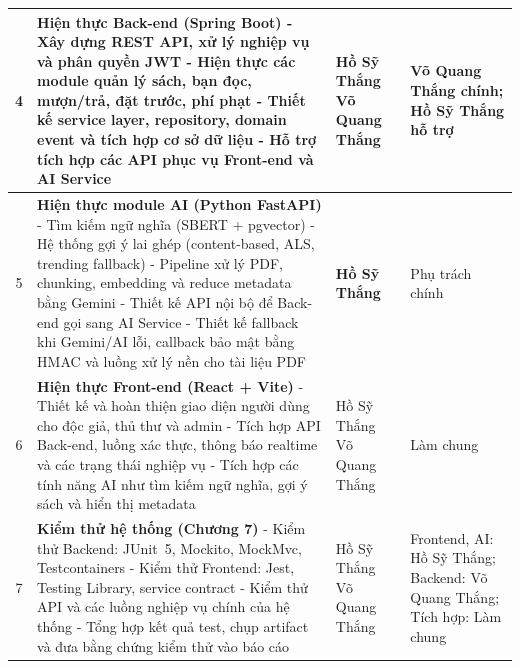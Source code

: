 \begin{center}
\begin{longtable}{|c|p{8.1cm}|p{2.8cm}|p{2.4cm}|}
4 & \textbf{Hiện thực Back-end (Spring Boot)} \newline
- Xây dựng REST API, xử lý nghiệp vụ và phân quyền JWT \newline
- Hiện thực các module quản lý sách, bạn đọc, mượn/trả, đặt trước, phí phạt \newline
- Thiết kế service layer, repository, domain event và tích hợp cơ sở dữ liệu \newline
- Hỗ trợ tích hợp các API phục vụ Front-end và AI Service
& Hồ Sỹ Thắng \newline Võ Quang Thắng & Võ Quang Thắng chính; Hồ Sỹ Thắng hỗ trợ \\
\hline

5 & \textbf{Hiện thực module AI (Python FastAPI)} \newline
- Tìm kiếm ngữ nghĩa (SBERT + pgvector) \newline
- Hệ thống gợi ý lai ghép (content-based, ALS, trending fallback) \newline
- Pipeline xử lý PDF, chunking, embedding và reduce metadata bằng Gemini \newline
- Thiết kế API nội bộ để Back-end gọi sang AI Service \newline
- Thiết kế fallback khi Gemini/AI lỗi, callback bảo mật bằng HMAC và luồng xử lý nền cho tài liệu PDF
& \textbf{Hồ Sỹ Thắng} & Phụ trách chính \\
\hline

6 & \textbf{Hiện thực Front-end (React + Vite)} \newline
- Thiết kế và hoàn thiện giao diện người dùng cho độc giả, thủ thư và admin \newline
- Tích hợp API Back-end, luồng xác thực, thông báo realtime và các trạng thái nghiệp vụ \newline
- Tích hợp các tính năng AI như tìm kiếm ngữ nghĩa, gợi ý sách và hiển thị metadata
& Hồ Sỹ Thắng \newline Võ Quang Thắng & Làm chung \\
\hline

7 & \textbf{Kiểm thử hệ thống (Chương 7)} \newline
- Kiểm thử Backend: JUnit~5, Mockito, MockMvc, Testcontainers \newline
- Kiểm thử Frontend: Jest, Testing Library, service contract \newline
- Kiểm thử API và các luồng nghiệp vụ chính của hệ thống \newline
- Tổng hợp kết quả test, chụp artifact và đưa bằng chứng kiểm thử vào báo cáo
& Hồ Sỹ Thắng \newline Võ Quang Thắng & Frontend, AI: Hồ Sỹ Thắng; Backend: Võ Quang Thắng; Tích hợp: Làm chung \\
\hline


\end{longtable}
\end{center}
